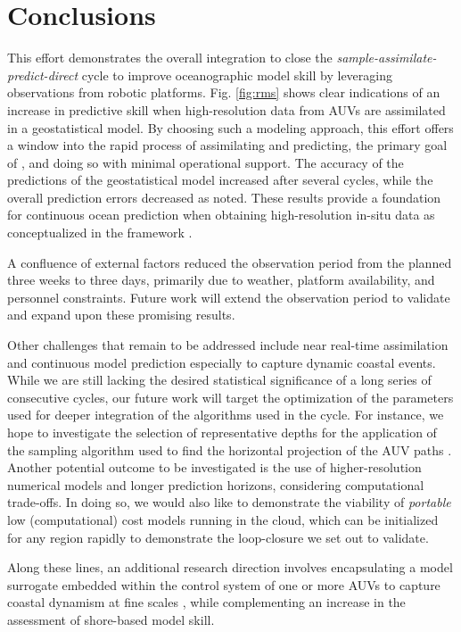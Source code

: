 \section{Conclusions}
\label{sec:conclude}


This effort demonstrates the overall integration to close the
\emph{sample-assimilate-predict-direct} cycle to improve oceanographic
model skill by leveraging observations from robotic
platforms. Fig. \ref{fig:rms} shows clear indications of an
increase in predictive skill when high-resolution data from AUVs are
assimilated in a geostatistical model. By choosing such a modeling
approach, this effort offers a window into the rapid process of
assimilating and predicting, the primary goal of \proje, and doing so
with minimal operational support. The accuracy of the predictions of
the geostatistical model increased after several cycles, while the
overall prediction errors decreased as noted. These results provide a
foundation for continuous ocean prediction when obtaining
high-resolution in-situ data as conceptualized in the \met framework
\cite{rajan21}.

A confluence of external factors reduced the observation period from
the planned three weeks to three days, primarily due to weather,
platform availability, and personnel constraints.  Future work will
extend the observation period to validate and expand upon these
promising results.

Other challenges that remain to be addressed include near real-time
assimilation and continuous model prediction especially to capture
dynamic coastal events.  While we are still lacking the desired
statistical significance of a long series of consecutive cycles, our
future work will target the optimization of the parameters used for
deeper integration of the algorithms used in the cycle. For instance,
we hope to investigate the selection of representative depths for the
application of the sampling algorithm used to find the horizontal
projection of the AUV paths \cite{bernacchi2025}. Another potential
outcome to be investigated is the use of higher-resolution numerical
models and longer prediction horizons, considering computational
trade-offs. In doing so, we would also like to demonstrate the
viability of \emph{portable} low (computational) cost models running
in the cloud, which can be initialized for any region rapidly to
demonstrate the loop-closure we set out to validate.

Along these lines, an additional research direction involves
encapsulating a model surrogate embedded within the control system of
one or more AUVs to capture coastal dynamism at fine scales
\cite{frolov09,fossum19b}, while complementing an increase in the
assessment of shore-based model skill.




